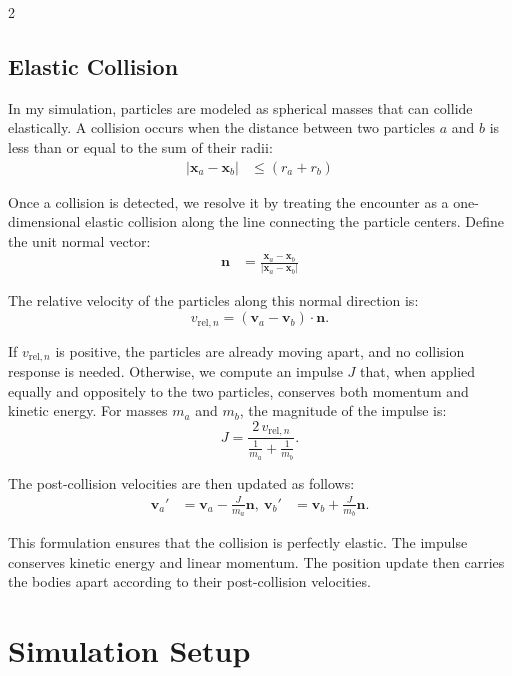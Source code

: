 \documentclass[a4paper, 12pt, oneside, onecolumn]{article}
\begin{document}
\begin{multicols}{2}
\subsection{Elastic Collision}

In my simulation, particles are modeled as spherical masses that can collide elastically. A collision occurs when the distance between two particles $a$ and $b$ is less than or equal to the sum of their radii:
\begin{align}
	\left|\mathbf{x}_a - \mathbf{x}_b \right|
	& \leq \left( r_a + r_b \right)
\end{align}

Once a collision is detected, we resolve it by treating the encounter as a one-dimensional elastic collision along the line connecting the particle centers. Define the unit normal vector:
\begin{align}
	\mathbf{n}
	&= \frac{\mathbf{x}_a - \mathbf{x}_b}{\left|\mathbf{x}_a - \mathbf{x}_b\right|}
\end{align}

The relative velocity of the particles along this normal direction is: \begin{equation} v_{\text{rel}, n} = \left(\mathbf{v}_a - \mathbf{v}_b\right) \cdot \mathbf{n}. \end{equation}

If $v_{\text{rel}, n}$ is positive, the particles are already moving apart, and no collision response is needed. Otherwise, we compute an impulse $J$ that, when applied equally and oppositely to the two particles, conserves both momentum and kinetic energy. For masses $m_a$ and $m_b$, the magnitude of the impulse is: \begin{equation} J = \frac{2\,v_{\text{rel}, n}}{\frac{1}{m_a} + \frac{1}{m_b}}. \end{equation}

The post-collision velocities are then updated as follows: \begin{align} \mathbf{v}_a' &= \mathbf{v}_a - \frac{J}{m_a}\mathbf{n}, \ \mathbf{v}_b' &= \mathbf{v}_b + \frac{J}{m_b}\mathbf{n}. \end{align}

This formulation ensures that the collision is perfectly elastic. The impulse conserves kinetic energy and linear momentum. The position update then carries the bodies apart according to their post-collision velocities.


\section{Simulation Setup}\label{sec:Simulation-Setup}


\end{multicols}
\end{document}
